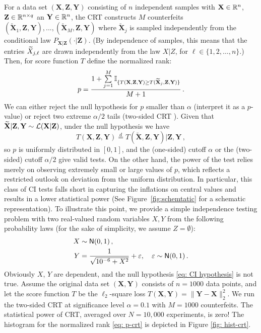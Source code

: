 \documentclass[11pt]{article}
\def\bX{\mathbf{X}}
\def\bY{\mathbf{Y}}
\def\bZ{\mathbf{Z}}
\def\normal{\mathsf{N}}
\def\tbX{\widetilde{\bX}}
\begin{document}
 For a data set $(\bX,\bZ,\bY)$ consisting of $n$ independent samples with $\bX\in \reals^n$, $\bZ\in\reals^{n\times q}$ an $\bY\in\reals^n$, the CRT constructs $M$ counterfeits $(\widetilde{\bX}_1,\bZ,\bY),...,(\widetilde{\bX}_M,\bZ,\bY)$ where $\widetilde{\bX}_j$ is sampled independently from the conditional law $P_{\bX|\bZ}(\cdot|\bZ)$. (By independence of samples, this means that the entries ${\widetilde{X}}_{j,\ell}$ are drawn independently from the law $X|Z$, for $\ell \in\{1,2,\dotsc, n\}$.) Then, for score function $T$ define the normalized rank: 
 \begin{equation}\label{eq: p-crt}
p=\frac{1+\sum\limits_{j=1}^{M}\ind_{\{T(\bX,\bZ,\bY)\geq T(\widetilde{\bX}_j,\bZ,\bY)\} } }{M+1}\,.
\end{equation}  
 We can either reject the null hypothesis for $p$ smaller than $\alpha$ (interpret it as a $p$-value) or reject two extreme $\alpha/2$ tails (two-sided CRT \cite{wang2020power}). Given that $\widetilde{\bX}|\bZ,\bY\sim\cL(\bX|\bZ)$, under the null hypothesis we have 
 \[
 T(\bX,\bZ,\bY) \stackrel{d}{=} T(\tbX,\bZ,\bY) | \bZ,\bY\,,
 \]
so $p$ is uniformly distributed in $[0,1]$, and the (one-sided) cutoff $\alpha$ or the (two-sided) cutoff $\alpha/2$ give valid tests. On the other hand, the power of the test relies merely on observing extremely small or large values of $p$, which reflects a restricted outlook on deviation from the uniform distribution. In particular, this class of CI tests falls short in capturing the inflations on central values and results in a lower statistical power (See Figure~\ref{fig:schemtatic} for a schematic representation). To illustrate this point, we provide a simple independence testing problem with two real-valued random variables $X,Y$ from the following probability laws (for the sake of simplicity, we assume $Z=\emptyset$): 
\begin{align} \label{eq: example}
X&\sim \normal(0,1)\,, \nonumber \\
Y&=\frac{1}{\sqrt{10^{-6}+X^2}} + \eps, \quad \eps\sim\normal(0,1)\,.
\end{align}
Obviously $X$, $Y$ are dependent, and the null hypothesis \ref{eq: CI hypothesis} is not true. Assume the original data set $(\bX,\bY)$ consists of $n=1000$ data points, and let the score function $T$ be the $\ell_2$-square loss $T(\bX,\bY)=\|\bY-\bX\|^2_2$. We run the two-sided CRT at significance level $\alpha=0.1$ with $M=1000$ counterfeits. The statistical power of CRT, averaged over $N=10,000$ experiments, is zero! The histogram for the normalized rank \eqref{eq: p-crt} is depicted in Figure \ref{fig: hist-crt}. 
\end{document}
